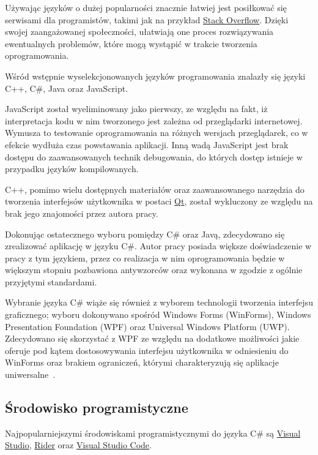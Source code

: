 \documentclass[skorowidz,skroty]{dyplomWEZUT}
\begin{document}
Używając języków o dużej popularności znacznie łatwiej jest posiłkować się serwisami dla programistów, takimi jak na przykład \href{www.stackoverflow.com}{Stack Overflow}. Dzięki swojej zaangażowanej społeczności, ułatwiają one proces rozwiązywania ewentualnych problemów, które mogą wystąpić w trakcie tworzenia oprogramowania.

Wśród wstępnie wyselekcjonowanych języków programowania znalazły się języki C++, C\#, Java oraz JavaScript.

JavaScript został wyeliminowany jako pierwszy, ze względu na fakt, iż interpretacja kodu w nim tworzonego jest zależna od przeglądarki internetowej. Wymusza to testowanie oprogramowania na różnych wersjach przeglądarek, co w efekcie wydłuża czas powstawania aplikacji. Inną wadą JavaScript jest brak dostępu do zaawansowanych technik debugowania, do których dostęp istnieje w przypadku języków kompilowanych.

C++, pomimo wielu dostępnych materiałów oraz zaawansowanego narzędzia do tworzenia interfejsów użytkownika w postaci \href{www.qt.io}{Qt}, został wykluczony ze względu na brak jego znajomości przez autora pracy.

Dokonując ostatecznego wyboru pomiędzy C\# oraz Javą, zdecydowano się zrealizować aplikację w języku C\#. Autor pracy posiada większe doświadczenie w pracy z tym językiem, przez co realizacja  w nim oprogramowania będzie w większym stopniu pozbawiona antywzorców oraz wykonana w zgodzie z ogólnie przyjętymi standardami. 

Wybranie języka C\# wiąże się również z wyborem technologii tworzenia interfejsu graficznego; wyboru dokonywano spośród Windows Forms (WinForms), Windows Presentation Foundation (WPF) oraz Universal Windows Platform (UWP). Zdecydowano się skorzystać z WPF ze względu na dodatkowe możliwości jakie oferuje pod kątem dostosowywania interfejsu użytkownika w odniesieniu do WinForms oraz brakiem ograniczeń, którymi charakteryzują się aplikacje uniwersalne~\cite{winformswpfuwp}. 


\subsection{Środowisko programistyczne}
Najpopularniejszymi środowiskami programistycznymi do języka C\# są \href{https://visualstudio.microsoft.com/vs/}{Visual Studio}, \href{https://www.jetbrains.com/rider/}{Rider} oraz \href{https://code.visualstudio.com}{Visual Studio Code}.
\end{document}
